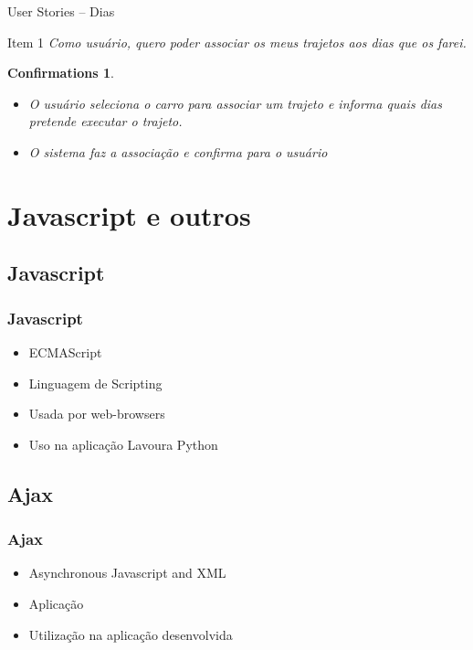 \documentclass[hyperref={pdfpagelabels=false},11pt]{beamer}
\newtheorem{confirmations}[theorem]{Confirmations}
\begin{document}
			\begin{frame}{User Stories -- Dias}
				\begin{block}{Item 1}
					\emph{Como usuário, quero poder associar os meus trajetos aos dias que os farei.}
					\begin{confirmations}
						\begin{itemize}
							\item O usuário seleciona o carro para associar um trajeto e informa quais dias pretende executar o trajeto.
							\item O sistema faz a associação e confirma para o usuário
						\end{itemize}
					\end{confirmations}
				\end{block}
			\end{frame}
					
		\section{Javascript e outros}
			\subsection{Javascript}
			
				\begin{frame}
					\frametitle{Javascript}
					\begin{itemize}
						\item{ECMAScript}
						\item{Linguagem de Scripting}
						\item{Usada por web-browsers}
						\item{Uso na aplicação Lavoura Python}
					\end{itemize}
				\end{frame}
				
			\subsection{Ajax}
			
				\begin{frame}
					\frametitle{Ajax}
					\begin{itemize}
						\item{Asynchronous Javascript and XML}
						\item{Aplicação}
						\item{Utilização na aplicação desenvolvida}
					\end{itemize}
				\end{frame}
				
\end{document}
